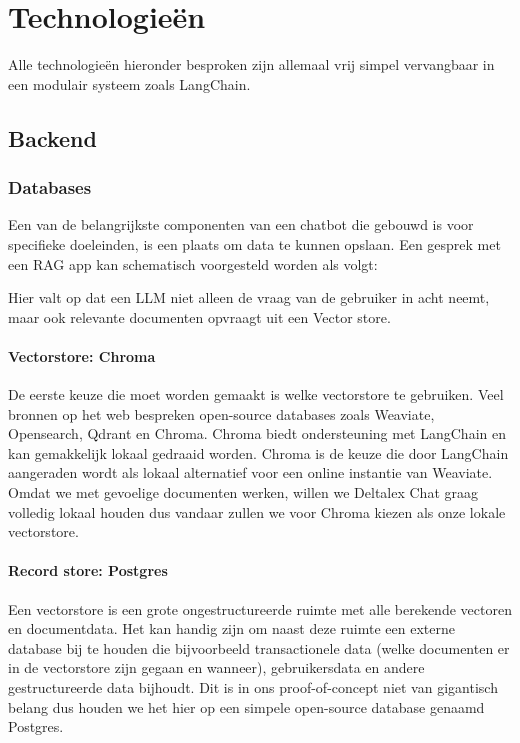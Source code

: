 \chapter{Technologieën}
\label{ch:technologies}
Alle technologieën hieronder besproken zijn allemaal vrij simpel vervangbaar in een modulair systeem zoals LangChain.

\section{Backend}
\subsection{Databases}
Een van de belangrijkste componenten van een chatbot die gebouwd is voor specifieke doeleinden, is een plaats om data te kunnen opslaan.
Een gesprek met een RAG app kan schematisch voorgesteld worden als volgt:

\begin{figure}[h]
\end{figure}

Hier valt op dat een LLM niet alleen de vraag van de gebruiker in acht neemt, maar ook relevante documenten opvraagt uit een Vector store. 

\subsubsection{Vectorstore: Chroma}
De eerste keuze die moet worden gemaakt is welke vectorstore te gebruiken. Veel bronnen op het web bespreken open-source databases zoals Weaviate, Opensearch, Qdrant en Chroma. 
Chroma biedt ondersteuning met LangChain en kan gemakkelijk lokaal gedraaid worden. 
Chroma is de keuze die door LangChain aangeraden wordt als lokaal alternatief voor een online instantie van Weaviate.  
Omdat we met gevoelige documenten werken, willen we Deltalex Chat graag volledig lokaal houden dus vandaar zullen we voor Chroma kiezen als onze lokale vectorstore. 

\subsubsection{Record store: Postgres}
Een vectorstore is een grote ongestructureerde ruimte met alle berekende vectoren en documentdata. 
Het kan handig zijn om naast deze ruimte een externe database bij te houden die bijvoorbeeld transactionele data (welke documenten er in de vectorstore zijn gegaan en wanneer), 
gebruikersdata en andere gestructureerde data bijhoudt. Dit is in ons proof-of-concept niet van gigantisch belang dus houden we het hier op een simpele open-source database genaamd Postgres. 

